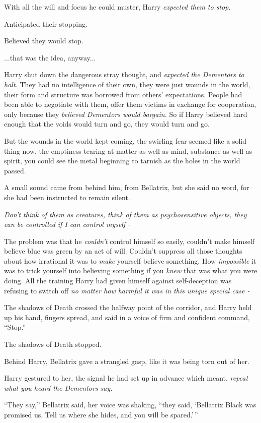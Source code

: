 With all the will and focus he could muster, Harry \emph{expected them to stop.}

Anticipated their stopping.

Believed they would stop.

...that was the idea, anyway...

Harry shut down the dangerous stray thought, and \emph{expected the Dementors to halt.} They had no intelligence of their own, they were just wounds in the world, their form and structure was borrowed from others' expectations. People had been able to negotiate with them, offer them victims in exchange for cooperation, only because they \emph{believed Dementors would bargain.} So if Harry believed hard enough that the voids would turn and go, they would turn and go.

But the wounds in the world kept coming, the swirling fear seemed like a solid thing now, the emptiness tearing at matter as well as mind, substance as well as spirit, you could see the metal beginning to tarnish as the holes in the world passed.

A small sound came from behind him, from Bellatrix, but she said no word, for she had been instructed to remain silent.

\emph{Don't think of them as creatures, think of them as psychosensitive objects, they can be controlled if I can control myself -}

The problem was that he \emph{couldn't} control himself so easily, couldn't make himself believe blue was green by an act of will. Couldn't suppress all those thoughts about how irrational it was to \emph{make} yourself believe something. How \emph{impossible} it was to trick yourself into believing something if you \emph{knew} that was what you were doing. All the training Harry had given himself against self-deception was refusing to switch off \emph{no matter how harmful it was in this unique special case -}

The shadows of Death crossed the halfway point of the corridor, and Harry held up his hand, fingers spread, and said in a voice of firm and confident command, ``Stop.''

The shadows of Death stopped.

Behind Harry, Bellatrix gave a strangled gasp, like it was being torn out of her.

Harry gestured to her, the signal he had set up in advance which meant, \emph{repeat what you heard the Dementors say.}

``They say,'' Bellatrix said, her voice was shaking, ``they said, `Bellatrix Black was promised us. Tell us where she hides, and you will be spared.'\,''

